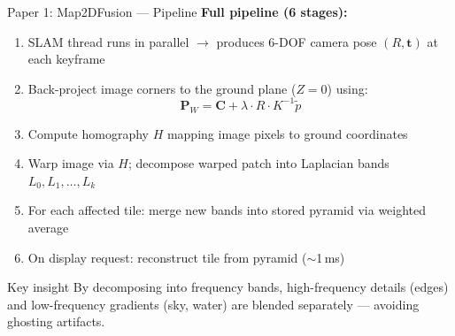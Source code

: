 \documentclass[aspectratio=169, 11pt]{beamer}
\begin{document}
\begin{frame}{Paper 1: Map2DFusion --- Pipeline}
\small
\textbf{Full pipeline (6 stages):}
\begin{enumerate}
    \item SLAM thread runs in parallel $\rightarrow$ produces 6-DOF camera pose $(R, \mathbf{t})$ at each keyframe
    \item Back-project image corners to the ground plane ($Z{=}0$) using:
    $$\mathbf{P}_W = \mathbf{C} + \lambda \cdot R \cdot K^{-1} \tilde{p}$$
    \item Compute homography $H$ mapping image pixels to ground coordinates
    \item Warp image via $H$; decompose warped patch into Laplacian bands $L_0, L_1, \ldots, L_k$
    \item For each affected tile: merge new bands into stored pyramid via weighted average
    \item On display request: reconstruct tile from pyramid ($\sim$1\,ms)
\end{enumerate}

\vspace{0.3em}
\begin{exampleblock}{Key insight}
By decomposing into frequency bands, high-frequency details (edges) and low-frequency gradients (sky, water) are blended separately --- avoiding ghosting artifacts.
\end{exampleblock}
\end{frame}
\end{document}

